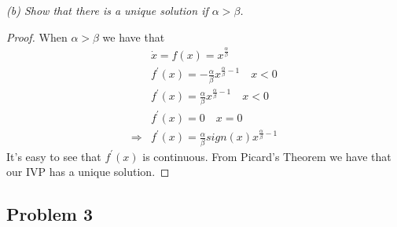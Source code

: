 \documentclass[12pt]{article}
\theoremstyle{remark}
\begin{document}
 	\newpage 
 	
 	\noindent \textit{(b) Show that there is a unique solution if $\alpha > \beta$.} \\
 	\begin{proof}
 		When $\alpha > \beta$ we have that 
 		\begin{align*}
 		& \dot{x} = f(x) = x^{\frac{\alpha}{\beta}} \\
 		& f^\prime(x) = -\frac{\alpha}{\beta}x^{\frac{\alpha}{\beta}-1} \quad x< 0 \\
 		& f^\prime(x) = \frac{\alpha}{\beta}x^{\frac{\alpha}{\beta}-1} \quad x< 0 \\
 		& f^\prime(x) = 0 \quad x = 0 \\
 		\Rightarrow & f^\prime(x) = \frac{\alpha}{\beta}sign(x)x^{\frac{\alpha}{\beta}-1}
 		\end{align*}
 		It's easy to see that $f^\prime(x)$ is continuous. From Picard's Theorem we have that our IVP has a unique solution.
 	\end{proof}
 	
 	\newpage
 	
 	\subsection*{Problem 3}
 	
\end{document}
